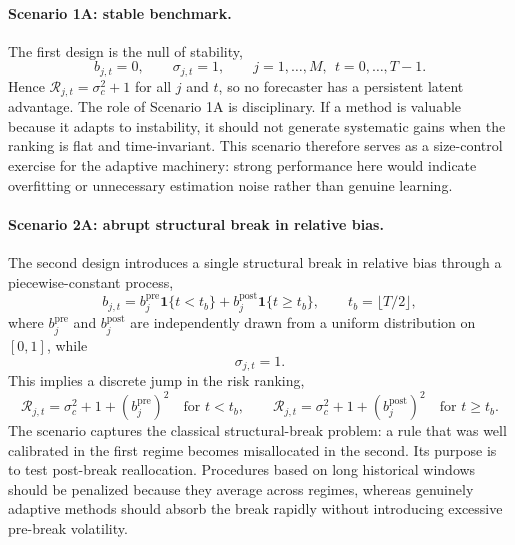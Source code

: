 \documentclass[11pt,a4paper]{article}
\begin{document}
\paragraph{Scenario 1A: stable benchmark.}
The first design is the null of stability,
\begin{equation}
b_{j,t}=0,
\qquad
\sigma_{j,t}=1,
\qquad
j=1,\dots,M,\ \ t=0,\dots,T-1.
\end{equation}
Hence $\mathcal{R}_{j,t}=\sigma_c^2+1$ for all $j$ and $t$, so no forecaster has a persistent latent advantage. The role of Scenario 1A is disciplinary. If a method is valuable because it adapts to instability, it should not generate systematic gains when the ranking is flat and time-invariant. This scenario therefore serves as a size-control exercise for the adaptive machinery: strong performance here would indicate overfitting or unnecessary estimation noise rather than genuine learning.

\paragraph{Scenario 2A: abrupt structural break in relative bias.}
The second design introduces a single structural break in relative bias through a piecewise-constant process,
\begin{equation}
b_{j,t}
=
b^{\mathrm{pre}}_j \mathbf{1}\{t<t_b\}
+ 
b^{\mathrm{post}}_j \mathbf{1}\{t\geq t_b\},
\qquad
t_b = \lfloor T/2 \rfloor,
\end{equation}
where $b^{\mathrm{pre}}_j$ and $b^{\mathrm{post}}_j$ are independently drawn from a uniform distribution on $[0,1]$, while
\begin{equation}
\sigma_{j,t}=1.
\end{equation}
This implies a discrete jump in the risk ranking,
\begin{equation}
\mathcal{R}_{j,t}
=
\sigma_c^2+1+\left(b^{\mathrm{pre}}_j\right)^2
\quad \text{for } t<t_b,
\qquad
\mathcal{R}_{j,t}
=
\sigma_c^2+1+\left(b^{\mathrm{post}}_j\right)^2
\quad \text{for } t\geq t_b.
\end{equation}
The scenario captures the classical structural-break problem: a rule that was well calibrated in the first regime becomes misallocated in the second. Its purpose is to test post-break reallocation. Procedures based on long historical windows should be penalized because they average across regimes, whereas genuinely adaptive methods should absorb the break rapidly without introducing excessive pre-break volatility.
\end{document}
